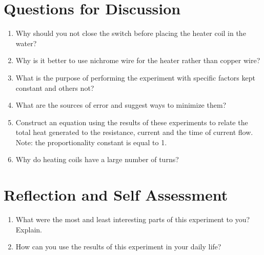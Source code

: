 \section{Questions for Discussion}
\begin{enumerate}
\item Why should you not close the switch before placing the heater coil in the water?
\item Why is it better to use nichrome wire for the heater rather than copper wire?
\item What is the purpose of performing the experiment with specific factors kept constant and others not?
\item What are the sources of error and suggest ways to minimize them?
\item Construct an equation using the results of these experiments to relate the total heat generated to the resistance, current and the time of current flow. Note: the proportionality constant is equal to 1. 
\item Why do heating coils have a large number of turns?
\end{enumerate}

\section{Reflection and Self Assessment}
\begin{enumerate}
\item What were the most and least interesting parts of this experiment to you? Explain.
\item How can you use the results of this experiment in your daily life? 
\end{enumerate}
